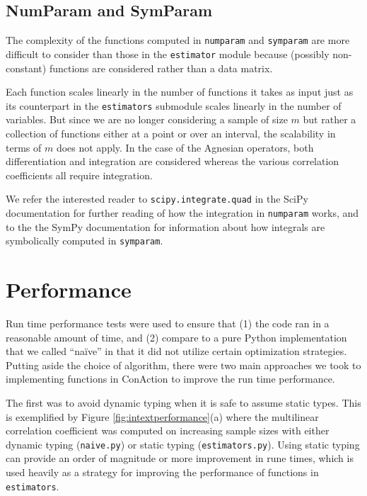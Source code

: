 \documentclass[
  letterpaper,
  DIV=11,
  numbers=noendperiod]{scrreprt}
\begin{document}
\subsection{NumParam and SymParam}\label{numparam-and-symparam}

The complexity of the functions computed in \texttt{numparam} and
\texttt{symparam} are more difficult to consider than those in the
\texttt{estimator} module because (possibly non-constant) functions are
considered rather than a data matrix.

Each function scales linearly in the number of functions it takes as
input just as its counterpart in the \texttt{estimators} submodule
scales linearly in the number of variables. But since we are no longer
considering a sample of size \(m\) but rather a collection of functions
either at a point or over an interval, the scalability in terms of \(m\)
does not apply. In the case of the Agnesian operators, both
differentiation and integration are considered whereas the various
correlation coefficients all require integration.

We refer the interested reader to \texttt{scipy.integrate.quad} in the
SciPy documentation for further reading of how the integration in
\texttt{numparam} works, and to the the SymPy documentation for
information about how integrals are symbolically computed in
\texttt{symparam}.

\section{Performance}\label{performance}

Run time performance tests were used to ensure that (1) the code ran in
a reasonable amount of time, and (2) compare to a pure Python
implementation that we called ``naïve'' in that it did not utilize
certain optimization strategies. Putting aside the choice of algorithm,
there were two main approaches we took to implementing functions in
ConAction to improve the run time performance.

The first was to avoid dynamic typing when it is safe to assume static
types. This is exemplified by Figure \ref{fig:intextperformance}(a)
where the multilinear correlation coefficient was computed on increasing
sample sizes with either dynamic typing (\texttt{naive.py}) or static
typing (\texttt{estimators.py}). Using static typing can provide an
order of magnitude or more improvement in rune times, which is used
heavily as a strategy for improving the performance of functions in
\texttt{estimators}.
\end{document}
